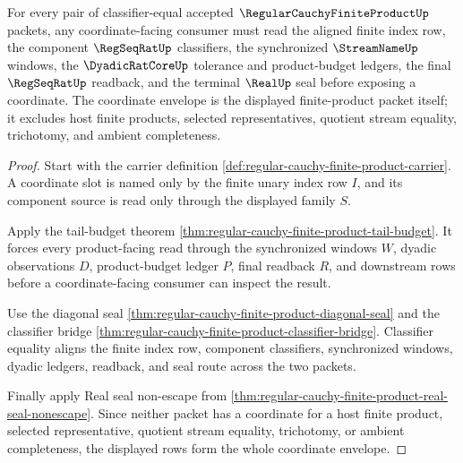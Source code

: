 \begin{theorem}
\label{thm:regular-cauchy-finite-product-coordinate-envelope}
For every pair of classifier-equal accepted $\RegularCauchyFiniteProductUp$ packets, any coordinate-facing consumer must read the aligned finite index row, the component $\RegSeqRatUp$ classifiers, the synchronized $\StreamNameUp$ windows, the $\DyadicRatCoreUp$ tolerance and product-budget ledgers, the final $\RegSeqRatUp$ readback, and the terminal $\RealUp$ seal before exposing a coordinate. The coordinate envelope is the displayed finite-product packet itself; it excludes host finite products, selected representatives, quotient stream equality, trichotomy, and ambient completeness.
\end{theorem}
\begin{proof}
Start with the carrier definition \autoref{def:regular-cauchy-finite-product-carrier}. A coordinate slot is named only by the finite unary index row $I$, and its component source is read only through the displayed family $S$.

Apply the tail-budget theorem \autoref{thm:regular-cauchy-finite-product-tail-budget}. It forces every product-facing read through the synchronized windows $W$, dyadic observations $D$, product-budget ledger $P$, final readback $R$, and downstream rows before a coordinate-facing consumer can inspect the result.

Use the diagonal seal \autoref{thm:regular-cauchy-finite-product-diagonal-seal} and the classifier bridge \autoref{thm:regular-cauchy-finite-product-classifier-bridge}. Classifier equality aligns the finite index row, component classifiers, synchronized windows, dyadic ledgers, readback, and seal route across the two packets.

Finally apply Real seal non-escape from \autoref{thm:regular-cauchy-finite-product-real-seal-nonescape}. Since neither packet has a coordinate for a host finite product, selected representative, quotient stream equality, trichotomy, or ambient completeness, the displayed rows form the whole coordinate envelope.
\end{proof}


